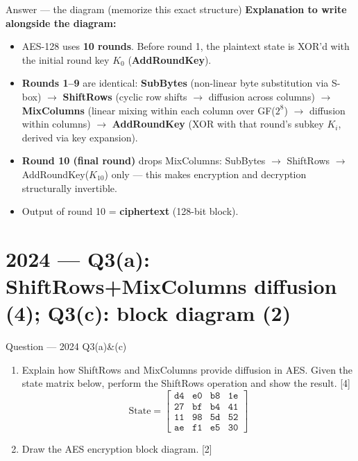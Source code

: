 \documentclass[12pt,a4paper]{article}
\begin{document}
\begin{solbox}{Answer --- the diagram (memorize this exact structure)}
\textbf{Explanation to write alongside the diagram:}
\begin{itemize}[noitemsep]
  \item AES-128 uses \textbf{10 rounds}. Before round 1, the plaintext state is XOR'd with the initial round key $K_0$ (\textbf{AddRoundKey}).
  \item \textbf{Rounds 1--9} are identical: \textbf{SubBytes} (non-linear byte substitution via S-box) $\to$ \textbf{ShiftRows} (cyclic row shifts $\to$ diffusion across columns) $\to$ \textbf{MixColumns} (linear mixing within each column over GF($2^8$) $\to$ diffusion within columns) $\to$ \textbf{AddRoundKey} (XOR with that round's subkey $K_i$, derived via key expansion).
  \item \textbf{Round 10 (final round)} drops MixColumns: SubBytes $\to$ ShiftRows $\to$ AddRoundKey($K_{10}$) only --- this makes encryption and decryption structurally invertible.
  \item Output of round 10 = \textbf{ciphertext} (128-bit block).
\end{itemize}
\end{solbox}

\section{2024 --- Q3(a): ShiftRows+MixColumns diffusion (4); Q3(c): block diagram (2)}

\begin{qbox}{Question --- 2024 Q3(a)\&(c)}
\begin{enumerate}[label=(\alph*)]
  \item[(a)] Explain how ShiftRows and MixColumns provide diffusion in AES. Given the state matrix below, perform the ShiftRows operation and show the result. \hfill [4]
\[
\text{State}=
\begin{bmatrix}
\texttt{d4} & \texttt{e0} & \texttt{b8} & \texttt{1e}\\
\texttt{27} & \texttt{bf} & \texttt{b4} & \texttt{41}\\
\texttt{11} & \texttt{98} & \texttt{5d} & \texttt{52}\\
\texttt{ae} & \texttt{f1} & \texttt{e5} & \texttt{30}
\end{bmatrix}
\]
  \item[(c)] Draw the AES encryption block diagram. \hfill [2]
\end{enumerate}
\end{qbox}
\end{document}
